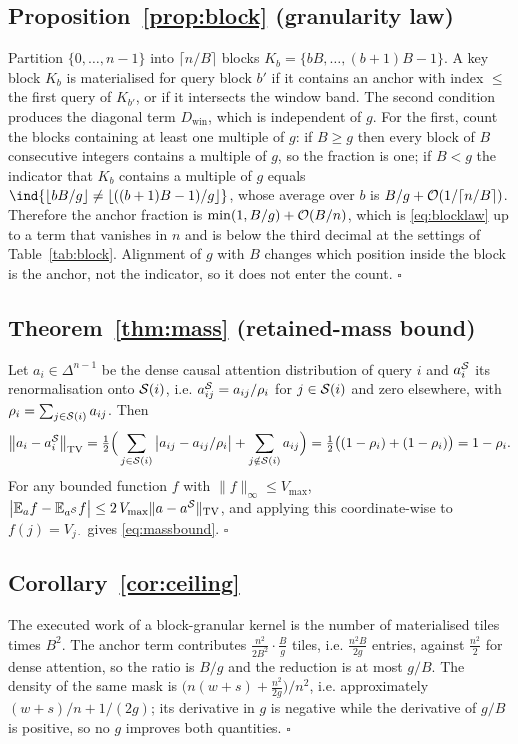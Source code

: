 \subsection*{Proposition~\ref{prop:block} (granularity law)}

Partition $\{0,\dots,n-1\}$ into $\lceil n/B\rceil$ blocks
$K_b=\{bB,\dots,(b+1)B-1\}$. A key block $K_b$ is materialised for query block $b'$
if it contains an anchor with index $\le$ the first query of $K_{b'}$, or if it
intersects the window band. The second condition produces the diagonal term
$D_{\mathrm{win}}$, which is independent of $g$. For the first, count the blocks
containing at least one multiple of $g$: if $B\ge g$ then every block of $B$
consecutive integers contains a multiple of $g$, so the fraction is one; if $B<g$
the indicator that $K_b$ contains a multiple of $g$ equals
$\ind{\lfloor bB/g\rfloor \ne \lfloor ((b+1)B-1)/g\rfloor}$, whose average over
$b$ is $B/g + \mathcal{O}(1/\lceil n/B\rceil)$. Therefore the anchor fraction is
$\min(1,B/g)+\mathcal{O}(B/n)$, which is \eqref{eq:blocklaw} up to a term that vanishes
in $n$ and is below the third decimal at the settings of
Table~\ref{tab:block}. Alignment of $g$ with $B$ changes which position inside the
block is the anchor, not the indicator, so it does not enter the count. $\square$

\subsection*{Theorem~\ref{thm:mass} (retained-mass bound)}

Let $a_i\in\Delta^{n-1}$ be the dense causal attention distribution of query $i$
and $a_i^{\mathcal{S}}$ its renormalisation onto $\mathcal{S}(i)$, i.e.
$a^{\mathcal{S}}_{ij}=a_{ij}/\rho_i$ for $j\in\mathcal{S}(i)$ and zero elsewhere, with
$\rho_i=\sum_{j\in\mathcal{S}(i)}a_{ij}$. Then
\[
\big\lVert a_i-a_i^{\mathcal{S}}\big\rVert_{\mathrm{TV}}
=\tfrac12\Big(\sum_{j\in\mathcal{S}(i)}\big\lvert a_{ij}-a_{ij}/\rho_i\big\rvert
+\sum_{j\notin\mathcal{S}(i)}a_{ij}\Big)
=\tfrac12\big((1-\rho_i)+(1-\rho_i)\big)=1-\rho_i .
\]
For any bounded function $f$ with $\lVert f\rVert_\infty\le V_{\max}$,
$\big\lvert\mathbb{E}_{a}f-\mathbb{E}_{a^{\mathcal{S}}}f\big\rvert
\le 2\,V_{\max}\lVert a-a^{\mathcal{S}}\rVert_{\mathrm{TV}}$, and applying this
coordinate-wise to $f(j)=V_{j\cdot}$ gives \eqref{eq:massbound}. $\square$

\subsection*{Corollary~\ref{cor:ceiling}}

The executed work of a block-granular kernel is the number of materialised tiles
times $B^2$. The anchor term contributes
$\frac{n^2}{2B^2}\cdot\frac{B}{g}$ tiles, i.e. $\frac{n^2 B}{2g}$ entries, against
$\frac{n^2}{2}$ for dense attention, so the ratio is $B/g$ and the reduction is at
most $g/B$. The density of the same mask is $\big(n(w+s)+\frac{n^2}{2g}\big)/n^2$, i.e.
approximately $(w+s)/n+1/(2g)$; its derivative in $g$ is
negative while the derivative of $g/B$ is positive, so no $g$ improves both
quantities. $\square$
